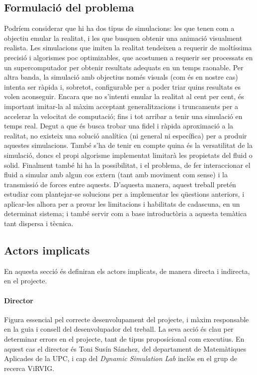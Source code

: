 \documentclass[a4paper]{report}
\begin{document}
	\subsection{Formulació del problema}
	Podríem considerar que hi ha dos tipus de simulacions: les que tenen com a objectiu emular la realitat, i les que busquen obtenir una animació visualment realista.\newline
	Les simulacions que imiten la realitat tendeixen a requerir de moltíssima precisió i algorismes poc optimizables, que acostumen a requerir ser processats en un supercomputador per obtenir resultats adequats en un temps raonable. \newline
	Per altra banda, la simulació amb objectius només visuals (com és en nostre cas) intenta ser ràpida i, sobretot, configurable per a poder triar quins resultats es volen aconseguir. Encara que no s'intenti emular la realitat al cent per cent, és important imitar-la al màxim acceptant generalitzacions i truncaments per a accelerar la velocitat de computació; fins i tot arribar a tenir una simulació en temps real.\newline
	Degut a que és busca trobar una fidel i ràpida aproximació a la realitat, no existeix una solució analítica (ni general ni específica) per a produir aquestes simulacions. També s'ha de tenir en compte quina és la versatilitat de la simulació, doncs el propi algorisme implementat limitarà les propietats del fluid o solid. Finalment també hi ha la possibilitat, i el problema, de fer interaccionar el fluid a simular amb algun cos extern (tant amb moviment com sense) i la transmissió de forces entre aquests. \newline
	D'aquesta manera, aquest treball pretén estudiar com plantejar-se solucions per a implementar les qüestions anteriors, i aplicar-les alhora per a provar les limitacions i habilitats de cadascuna, en un determinat sistema; i també servir com a base introductòria a aquesta temàtica tant dispersa i tècnica.
	
	\subsection{Actors implicats}
	En aquesta secció és definiran els actors implicats, de manera directa i indirecta, en el projecte.
	\paragraph{Director} Figura essencial pel correcte desenvolupament del projecte, i màxim responsable en la guia i consell del desenvolupador del treball. La seva acció és clau per determinar errors en el projecte, tant de tipus proposicional com executius. En aquest cas el director és Toni Susín Sánchez, del departament de Matemàtiques Aplicades de la UPC, i cap del \textit{Dynamic Simulation Lab} inclòs en el grup de recerca ViRVIG.
\end{document}
